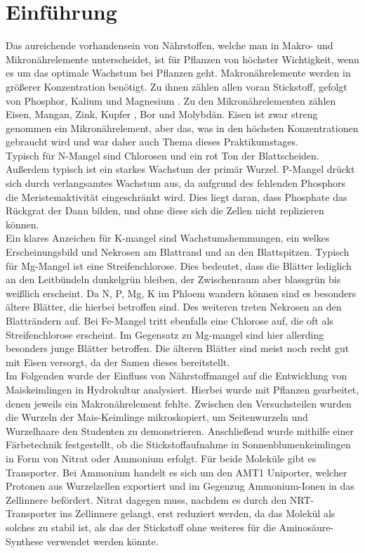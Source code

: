 \documentclass[10pt,a4paper]{article}
\begin{document}
	\tableofcontents
	
	\section{Einführung}	
		Das aureichende vorhandensein von Nährstoffen, welche man in Makro- und Mikronährelemente unterscheidet, ist für Pflanzen von höchster Wichtigkeit, wenn es um das optimale Wachstum bei Pflanzen geht. 
		Makronährelemente werden in größerer Konzentration benötigt. Zu ihnen zählen allen voran Stickstoff, gefolgt von Phosphor, Kalium und Magnesium . Zu den Mikronährelementen zählen Eisen, Mangan, Zink, Kupfer , Bor und Molybdän. Eisen ist zwar streng genommen ein Mikronährelement, aber das, was in den höchsten Konzentrationen gebraucht wird und war daher auch Thema dieses Praktikumstages.\\
		Typisch für N-Mangel sind Chlorosen und ein rot Ton der Blattscheiden. Außerdem typisch ist ein starkes Wachstum der primär Wurzel.
		P-Mangel drückt sich durch verlangsamtes Wachstum aus, da aufgrund des fehlenden Phosphors die Meristemaktivität eingeschränkt wird. Dies liegt daran, dass Phosphate das Rückgrat der Dann bilden, und ohne diese sich die Zellen nicht replizieren können.\\
		Ein klares Anzeichen für K-mangel sind Wachstumshemmungen, ein welkes Erscheinungsbild und Nekrosen am Blattrand und an den Blattspitzen.
		Typisch für Mg-Mangel ist eine Streifenchlorose. Dies bedeutet, dass die Blätter lediglich an den Leitbündeln dunkelgrün bleiben, der Zwischenraum aber blassgrün bis weißlich erscheint. Da N, P, Mg, K im Phloem wandern können sind es besonders ältere Blätter, die hierbei betroffen sind. Des weiteren treten Nekrosen an den Blatträndern auf. 
		Bei Fe-Mangel tritt ebenfalls eine Chlorose auf, die oft als Streifenchlorose erscheint. Im Gegensatz zu Mg-mangel sind hier allerding besonders junge Blätter betroffen. Die älteren Blätter sind meist noch recht gut mit Eisen versorgt, da der Samen dieses bereitstellt.\\
		Im Folgenden wurde der Einfluss von Nährstoffmangel auf die Entwicklung von Maiskeimlingen in Hydrokultur analysiert. Hierbei wurde mit Pflanzen gearbeitet, denen jeweils ein Makronährelement fehlte. Zwischen den Versuchsteilen wurden die Wurzeln der Mais-Keimlinge mikroskopiert, um Seitenwurzeln und Wurzelhaare den Studenten zu demonstrieren. Anschließend wurde mithilfe einer Färbetechnik festgestellt, ob die Stickstoffaufnahme in Sonnenblumenkeimlingen in Form von Nitrat oder Ammonium erfolgt. Für beide Moleküle gibt es Transporter. Bei Ammonium handelt es sich um den AMT1 Uniporter, welcher Protonen aus Wurzelzellen exportiert und im Gegenzug Ammonium-Ionen in das Zellinnere befördert. Nitrat dagegen muss, nachdem es durch den NRT-Transporter ins Zellinnere gelangt, erst reduziert werden, da das Molekül als solches zu stabil ist, als das der Stickstoff ohne weiteres für die Aminosäure-Synthese verwendet werden könnte.\\
\end{document}

